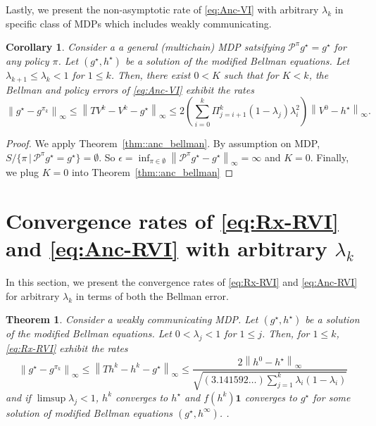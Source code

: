 \documentclass{article} %
\newcommand{\cP}{\mathcal{P}}
\newcommand*{\para}[1]{\left({#1}\right)}
\newcommand*{\infn}[1]{\left\|{#1}\right\|_{\infty}}
\newtheorem{theorem}{Theorem}
\newtheorem{corollary}{Corollary}
\begin{document}
Lastly, we present the non-asymptotic rate of \ref{eq:Anc-VI} with arbitrary $\lambda_k$ in specific class of MDPs which includes weakly communicating. 
\begin{corollary}\label{cor::Bellman_weakly_anc}
 Consider a a general (multichain) MDP satsifying $\cP^{\pi}g^{\star}=g^{\star}$ for any policy $\pi$. Let $(g^{\star},h^{\star})$ be a solution of the modified Bellman equations. Let $\lambda_{k+1} \le \lambda_{k}<1$ for $1 \le k$. Then, there exist $ 0<K$ such that for $K < k$, the Bellman and policy errors of \ref{eq:Anc-VI} exhibit the rates 
     \[\infn{g^{\star}-g^{\pi_k}}  \le \infn{TV^k-V^k -g^{\star}} \le 2\para{\sum^k_{i=0} \Pi^k_{j=i+1}(1-\lambda_j) \lambda^2_i }\infn{V^0-h^{\star}}.\]
\end{corollary}
\begin{proof}
We apply Theorem~\ref{thm::anc_bellman}. By assumption on MDP, $ S / \{\pi \,|\,\cP^{\pi}g^{\star} =  g^{\star}\} = \emptyset$. So $\epsilon=\inf_{\pi \in \emptyset} \infn{\cP^{\pi}g^{\star}-g^{\star}} = \infty$ and $K=0$. Finally, we plug $K=0$ into Theorem~\ref{thm::anc_bellman}
\end{proof}

\vspace{0.1in}

\section{Convergence rates of \ref{eq:Rx-RVI} and \ref{eq:Anc-RVI} with arbitrary $\lambda_k$}\label{s::omitted-RVI-theorems}
In this section, we present the convergence rates of \ref{eq:Rx-RVI} and \ref{eq:Anc-RVI} for arbitrary $\lambda_k$ in terms of both the Bellman error.
\begin{theorem}\label{thm::Rx-RVI}
Consider a weakly communicating MDP. Let $(g^{\star},h^{\star})$ be a solution of the modified Bellman equations. Let $0<\lambda_j<1$ for $1 \le j$. Then, for $1 \le k$, \ref{eq:Rx-RVI} exhibit the rates
    \[\infn{g^{\star}-g^{\pi_k}} \le \infn{Th^k-h^k-g^{\star}} \le \frac{2\infn{h^0-h^{\star}}}{\sqrt{(3.141592\dots)\sum^{k}_{j=1} \lambda_i(1-\lambda_{i})}}\]
    and if $\limsup \lambda_j <1  $, $h^k$ converges to $h^{\star}$ and $f(h^k)\mathbf{1}$ converges to $g^{\star}$ for some solution of modified Bellman equations  $(g^{\star}, h^\infty)$. .
\end{theorem}
\end{document}
